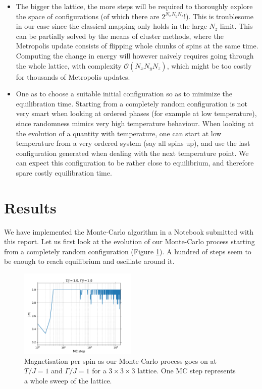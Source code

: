 \documentclass[11pt,openany]{article}
\begin{document}
\begin{itemize}
	
	\item The bigger the lattice, the more steps will be required to thoroughly explore the space of configurations (of which there are $2^{N_xN_yN_z}$!). This is troublesome in our case since the classical mapping only holds in the large $N_z$ limit. This can be partially solved by the means of cluster methods, where the Metropolis update consists of flipping whole chunks of spins at the same time. Computing the change in energy will however naively requires going through the whole lattice, with complexity $\mathcal{O}\left(N_xN_yN_z\right)$, which might be too costly for thousands of Metropolis updates.
	
	\item One as to choose a suitable initial configuration so as to minimize the equilibration time. Starting from a completely random configuration is not very smart when looking at ordered phases (for example at low temperature), since randomness mimics very high temperature behaviour. When looking at the evolution of a quantity with temperature, one can start at low temperature from a very ordered system (say all spins up), and use the last configuration generated when dealing with the next temperature point. We can expect this configuration to be rather close to equilibrium, and therefore spare costly equilibration time.
	
\end{itemize}


\section{Results}

We have implemented the Monte-Carlo algorithm in a Notebook submitted with this report. Let us first look at the evolution of our Monte-Carlo process starting from a completely random configuration (Figure \ref{fig:MC}).  A hundred of steps seem to be enough to reach equilibrium and oscillate around it.

\begin{figure}[H]
	\centering
	\includegraphics[width=0.5\textwidth]{Plots/MC.pdf}
	\caption{Magnetisation per spin as our Monte-Carlo process goes on at $T/J=1$ and $\Gamma/J=1$ for a $3\times3\times3$ lattice. One MC step represents a whole sweep of the lattice.}
	\label{fig:MC}
\end{figure}
\end{document}
